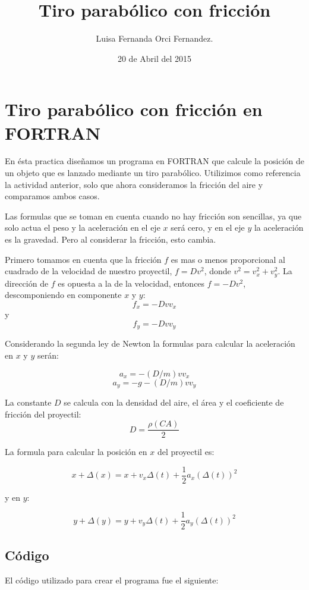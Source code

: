 \documentclass[10pt]{article}
\title{Tiro parabólico con fricción}
\author{Luisa Fernanda Orci Fernandez.}
\date{20 de Abril del 2015}
\begin{document}
\maketitle

\section{Tiro parabólico con fricción en FORTRAN}
En ésta practica diseñamos un programa en FORTRAN que calcule la posición de un objeto que es lanzado mediante un tiro parabólico. Utilizimos como referencia la actividad anterior, solo que ahora consideramos la fricción del aire y comparamos ambos casos.

Las formulas que se toman en cuenta cuando no hay fricción son sencillas, ya que solo actua el peso y la aceleración en el eje $ x $ será cero, y en el eje $ y $ la aceleración es la gravedad. Pero al considerar la fricción, esto cambia. 

Primero tomamos en cuenta que la fricción $ f $ es mas o menos proporcional al cuadrado de la velocidad de nuestro proyectil, $ f = Dv^2 $, donde $ v^2 = v_x^2 + v_y^2 $. La dirección de $ f $ es opuesta a la de la velocidad, entonces $ f = -Dv^2 $, descomponiendo en componente $ x $ y $ y $: $$ f_x = -Dvv_x $$ y $$ f_y = -Dvv_y $$

Considerando la segunda ley de Newton la formulas para calcular la aceleración en $ x $ y $ y $ serán: 

$$ a_x = -(D/m)vv_x $$
$$ a_y = -g-(D/m)vv_y $$

La constante $D$ se calcula con la densidad del aire, el área y el coeficiente de fricción del proyectil: 
$$ D = \frac{\rho(CA)}{2} $$

La formula para calcular la posición en $ x $ del proyectil es:

$$ x+\Delta(x) = x+v_x\Delta(t)+\frac{1}{2}a_x(\Delta(t))^2 $$

y en $ y $:

$$ y+\Delta(y) = y+v_y\Delta(t)+\frac{1}{2}a_y(\Delta(t))^2 $$

\newpage

\subsection{Código}
El código utilizado para crear el programa fue el siguiente:
\end{document}
